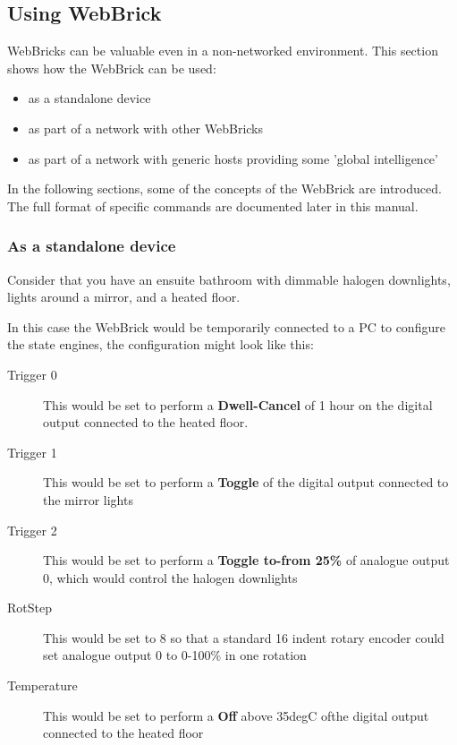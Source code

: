\subsection{Using WebBrick}

    WebBricks can be valuable even in a non-networked environment.  This section shows how the WebBrick can be used:
    \begin{itemize}
    \item as a standalone device
    \item as part of a network with other WebBricks
    \item as part of a network with generic hosts providing some 'global intelligence'
    \end{itemize}
    
    In the following sections, some of the concepts of the WebBrick are introduced.  The full format of specific commands are documented
    later in this manual.

\subsubsection{As a standalone device}


Consider that you have an ensuite bathroom with dimmable halogen downlights, lights around a mirror, and a heated floor.

In this case the WebBrick would be temporarily connected to a PC to configure the state engines, the configuration might look like this:

\begin{description}
\item[Trigger 0]  This would be set to perform a \textbf {Dwell-Cancel} of 1 hour on the digital output connected to the heated floor.
\item[Trigger 1]  This would be set to perform a \textbf {Toggle} of the digital output connected to the mirror lights
\item[Trigger 2]  This would be set to perform a \textbf {Toggle to-from 25\% } of analogue output 0, which would control the halogen downlights
\item[RotStep]  This would be set to 8 so that a standard 16 indent rotary encoder could set analogue output 0 to 0-100\% in one rotation
\item[Temperature]  This would be set to perform a \textbf {Off} above 35degC ofthe digital output connected to the heated floor
\end{description}

